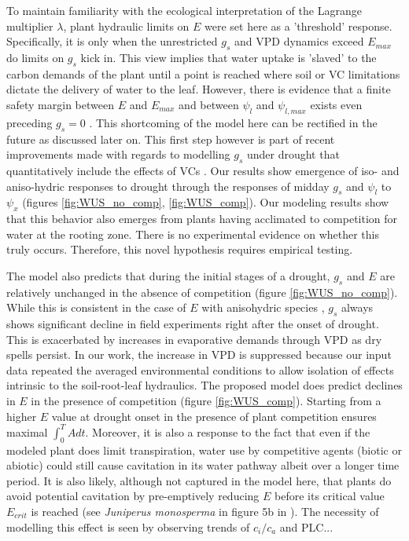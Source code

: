 \documentclass[utf8]{frontiersSCNS} %
\begin{document}
 To maintain familiarity with the ecological interpretation of the Lagrange multiplier $\lambda$, plant hydraulic limits on $E$ were set here as a 'threshold' response. Specifically, it is only when the unrestricted $g_s$ and VPD dynamics exceed $E_{max}$ do limits on $g_s$ kick in. This view implies that water uptake is 'slaved' to the carbon demands of the plant until a point is reached where soil or VC limitations dictate the delivery of water to the leaf.  However, there is evidence that a finite safety margin between $E$ and $E_{max}$ and between $\psi_l$ and $\psi_{l, max}$ exists even preceding $g_s = 0$ \citep{mcdowell_mechanisms_2008, plaut_hydraulic_2012}. This shortcoming of the model here can be rectified in the future as discussed later on. This first step however is part of recent improvements made with regards to modelling $g_s$ under drought that quantitatively include the effects of VCs \citep{sperry_what_2015, sperry_predicting_2017}. Our results show emergence of iso- and aniso-hydric responses to drought through the responses of midday $g_s$ and $\psi_l$ to $\psi_x$ (figures \ref{fig:WUS_no_comp}, \ref{fig:WUS_comp}). Our modeling results show that this behavior also emerges from plants having acclimated to competition for water at the rooting zone. There is no experimental evidence on whether this truly occurs. Therefore, this novel hypothesis requires empirical testing.

The model also predicts that during the initial stages of a drought, $g_s$ and $E$ are relatively unchanged in the absence of competition (figure \ref{fig:WUS_no_comp}). While this is consistent in the case of $E$ with anisohydric species \citep{hochberg_iso/anisohydry:_2018}, $g_s$ always shows significant decline in field experiments right after the onset of drought. This is exacerbated by increases in evaporative demands through VPD as dry spells persist. In our work, the increase in VPD is suppressed because our input data repeated the averaged environmental conditions to allow isolation of effects intrinsic to the soil-root-leaf hydraulics. The proposed model does predict declines in $E$ in the presence of competition (figure \ref{fig:WUS_comp}). Starting from a higher $E$ value at drought onset in the presence of plant competition ensures maximal $\int_0^T A dt$. Moreover, it is also a response to the fact that even if the modeled plant does limit transpiration, water use by competitive agents (biotic or abiotic) could still cause cavitation in its water pathway albeit over a longer time period. It is also likely, although not captured in the model here, that plants do avoid potential cavitation by pre-emptively reducing $E$ before its critical value $E_{crit}$ is reached (see \textit{Juniperus monosperma} in figure 5b in \citet{garciaforner_responses_2016}).  The necessity of modelling this effect is seen by observing trends of $c_i / c_a$ and PLC...
\end{document}
